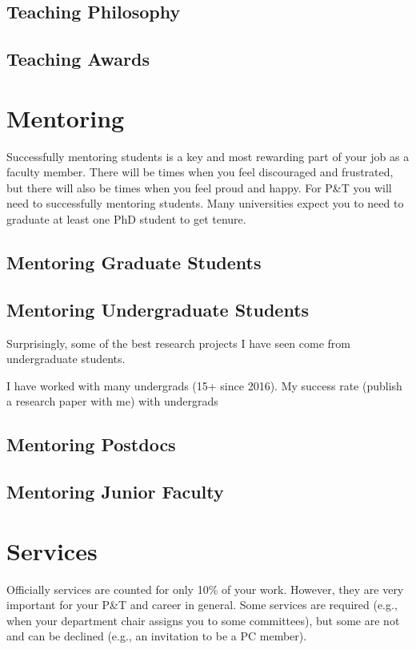 \documentclass[oneside,11pt,dvipsnames]{book}
\begin{document}
\section{Teaching Philosophy}
\section{Teaching Awards}



\chapter{Mentoring}

Successfully mentoring students is a key and most rewarding part of your job as a faculty member. 
There will be times when you feel discouraged and frustrated, but there will also be times when you feel proud and happy.  
For P\&T you will need to successfully mentoring students.  Many universities expect you to need to graduate at least one PhD student to get tenure.

\section{Mentoring Graduate Students}


\section{Mentoring Undergraduate Students}
Surprisingly, some of the best research projects I have seen come from undergraduate students.  


I have worked with many undergrads (15+ since 2016). My success rate (publish a research paper with me) with undergrads 


\section{Mentoring Postdocs}
\section{Mentoring Junior Faculty}

\chapter{Services}\label{sec:services}


Officially services are counted for only 10\% of your work. However, they are very important for your P\&T and career in general.
Some services are required (e.g., when your department chair assigns you to some committees), but some are not and can be declined (e.g., an invitation to be a PC member).  
\end{document}
